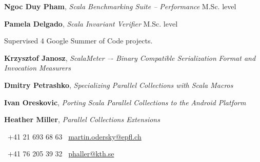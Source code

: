\documentclass[9pt]{article}
\begin{document}
\noindent
{\bf Ngoc Duy Pham},
{\em Scala Benchmarking Suite -- Performance}
\newline{}
\newline\noindent M.Sc. level
\medskip

\noindent
{\bf Pamela Delgado},
{\em Scala Invariant Verifier}
\newline\noindent M.Sc. level
\medskip

\bigskip

\medskip
{}


\noindent
Supervised 4 Google Summer of Code projects.
\newline

\noindent
{\bf Krzysztof Janosz},
{\em ScalaMeter –- Binary Compatible Serialization }
\newline\noindent
{\em Format and Invocation Measurers}
\dates{}
\medskip

\noindent
{\bf Dmitry Petrashko},
{\em Specializing Parallel Collections with Scala Macros }
\medskip

\noindent
{\bf Ivan Oreskovic},
{\em Porting Scala Parallel Collections to the }
\newline\noindent
{\em Android Platform}
\dates{}
\medskip

\noindent
{\bf Heather Miller},
{\em Parallel Collections Extensions}
\medskip


\pagebreak
\medskip
{}

\newline{}
\newline{}
\newline\noindent \faPhone~+41 21 693 68 63
\newline\noindent \Letter~\href{mailto:martin.odersky@epfl.ch}{martin.odersky@epfl.ch}
\medskip

\newline{}
\newline{}
\newline\noindent \faPhone~+41 76 205 39 32
\newline\noindent \Letter~\href{mailto:phaller@kth.se}{phaller@kth.se}
\medskip
\end{document}
